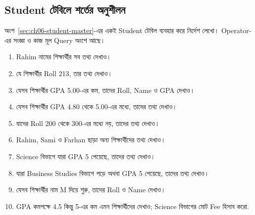 \subsection{Student টেবিলে শর্তের অনুশীলন}
অংশ~\ref{sec:ch06-student-master}-এর একই Student টেবিল ব্যবহার করে নির্দেশ লেখো। Operator-এর সংজ্ঞা ও কাজ মূল Query অংশে আছে।
\begin{enumerate}
\item Rahim নামের শিক্ষার্থীর সব তথ্য দেখাও।
\item যে শিক্ষার্থীর Roll 213, তার তথ্য দেখাও।
\item যেসব শিক্ষার্থীর GPA 5.00-এর কম, তাদের Roll, Name ও GPA দেখাও।
\item যেসব শিক্ষার্থীর GPA 4.80 থেকে 5.00-এর মধ্যে, তাদের তথ্য দেখাও।
\item যাদের Roll 200 থেকে 300-এর মধ্যে নয়, তাদের তথ্য দেখাও।
\item Rahim, Sami ও Farhan ছাড়া অন্য শিক্ষার্থীদের তথ্য দেখাও।
\item Science বিভাগে যারা GPA 5 পেয়েছে, তাদের তথ্য দেখাও।
\item যারা Business Studies বিভাগে পড়ে অথবা GPA 5 পেয়েছে, তাদের তথ্য দেখাও।
\item যেসব শিক্ষার্থীর নাম M দিয়ে শুরু, তাদের Roll ও Name দেখাও।
\item GPA কমপক্ষে 4.5 কিন্তু 5-এর কম এমন শিক্ষার্থীদের দেখাও; Science বিভাগের মোট Fee হিসাব করো.
\end{enumerate}
